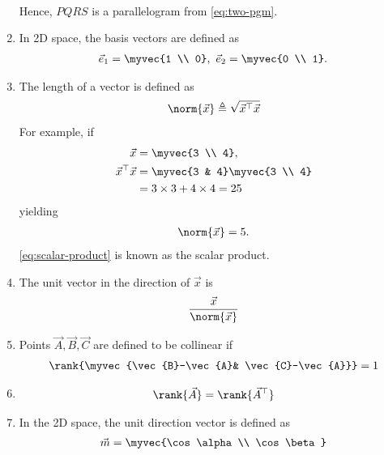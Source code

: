 \begin{enumerate}[label=\thesubsection.\arabic*.,ref=\thesubsection.\theenumi]
\begin{align}
\end{align}
Hence, $PQRS$ is a parallelogram
	  from \eqref{eq:two-pgm}.
	\item In 2D space,  the basis vectors are defined as 
\begin{align}
	\vec{e}_1 = \myvec{1 \\ 0},\
	\vec{e}_2 = \myvec{0 \\ 1}.
\end{align}
	\item The length of a vector  is  defined as
		\begin{align}
		\label{eq:side-length}
			 \norm{\vec{x}} \triangleq \sqrt{\vec{x}^{\top}\vec{x}}
		\end{align}
		For example, if 
\begin{align}
\vec{x}
	&=\myvec{3 \\ 4},
	\\
	\vec{x}^{\top}\vec{x} &= \myvec{3 & 4}\myvec{3 \\ 4}
	\label{eq:scalar-product}
	\\
	&=3 \times 3 + 4 \times 4 = 25
\end{align}
yielding
		\begin{align}
			 \norm{\vec{x}} = 5.
		\end{align}
	\eqref{eq:scalar-product}
	is known as the scalar product.
	\item The unit vector in the direction of $\vec{x}$ is 
		\begin{align}
		\label{eq:unit-vec}
			 \frac{\vec{x}}{\norm{\vec{x}}} 
		\end{align}
		\iffalse
\item   For a 2D space, 
	points $\vec{A}, \vec{B}, \vec{C}$ are defined to be collinear if 
		\fi
	\item 
	Points $\vec{A}, \vec{B}, \vec{C}$ are defined to be collinear if 
		\begin{align}
			\label{eq:line-rank-2}
			\rank{\myvec{\vec{B}-\vec{A}& \vec{C}-\vec{A}}} = 1
		\end{align}
	\item 
\begin{align}
			\label{eq:mat-rank-t}
	\rank{\vec{A}}
	=
	\rank{\vec{A}^\top}
\end{align}
\item In the 2D space, the unit direction vector is defined as
\begin{align}
		\label{eq:dir-vec-3d}
\vec{m}=\myvec{\cos \alpha\\ \cos \beta }
\end{align}

\end{enumerate}
